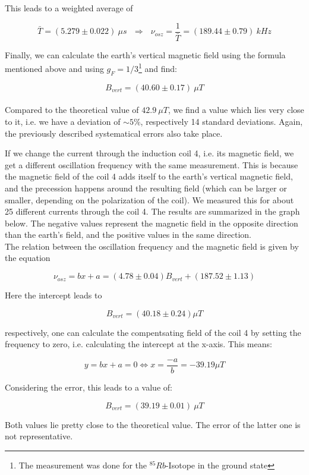 This leads to a weighted average of

$$ \bar T = (5.279 \pm 0.022)\ \mu s \ \ \ \Rightarrow \ \ \ \nu_{osz}=\frac{1}{\bar T}= (189.44 \pm 0.79)\ kHz$$

Finally, we can calculate the earth's vertical magnetic field using the formula mentioned above and using $g_F = 1/3$\footnote{The measurement was done for the $^{85}Rb$-Isotope in the ground state} and find:

$$\boxed{ B_{vert} = (40.60 \pm 0.17)\ \mu T }$$\\

Compared to the theoretical value of $42.9\ \mu T$, we find a value which lies very close to it, i.e. we have a deviation of $\sim 5\%$, respectively 14 standard deviations. Again, the previously described systematical errors also take place.

If we change the current through the induction coil 4, i.e. its magnetic field, we get a different oscillation frequency with the same measurement. This is because the magnetic field of the coil 4 adds itself to the earth's vertical magnetic field, and the precession happens around the resulting field (which can be larger or smaller, depending on the polarization of the coil).  We measured this for about 25 different currents through the coil 4. The results are summarized in the graph below. The negative values represent the magnetic field in the opposite direction than the earth's field, and the positive values in the same direction.\\

The relation between the oscillation frequency and the magnetic field is given by the equation

$$\nu_{osz} = bx + a = (4.78\pm0.04)B_{vert} + (187.52\pm1.13)$$

Here the intercept leads to

$$B_{vert} = (40.18 \pm 0.24)\mu T$$

respectively, one can calculate the compentsating field of the coil 4 by setting the frequency to zero, i.e. calculating the intercept at the x-axis. This means:

$$ y = bx + a = 0 \Leftrightarrow x = \frac{-a}{b} = -39.19 \mu T $$

Considering the error, this leads to a value of:

$$ B_{vert} = (39.19 \pm 0.01)\ \mu T $$

Both values lie pretty close to the theoretical value. The error of the latter one is not representative.

